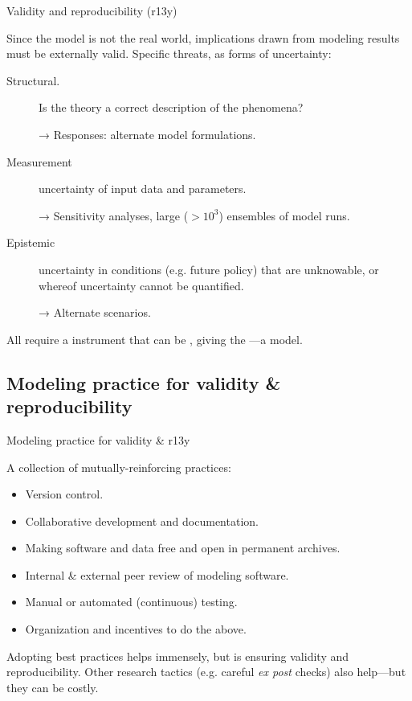 \documentclass[12pt,aspectratio=169]{beamer}
\begin{document}
\begin{frame}{Validity and reproducibility (r13y)}

  Since the model is not the real world, implications drawn from modeling results must be externally valid.
  Specific threats, as forms of uncertainty:

  \begin{description}
    \item [Structural.] Is the theory a correct description of the phenomena?

          → Responses: alternate model formulations.

    \item [Measurement] uncertainty of input data and parameters.

          → Sensitivity analyses, large ($>10^3$) ensembles of model runs.

    \item [Epistemic] uncertainty in conditions (e.g. future policy) that are unknowable, or whereof uncertainty cannot be quantified.

          → Alternate scenarios.
  \end{description}

  All require a  instrument that can be , giving the —a  model.
\end{frame}

\subsection{Modeling practice for validity \& reproducibility}
\begin{frame}{Modeling practice for validity \& r13y}

  A collection of mutually-reinforcing practices:
  \begin{itemize} \small
    \item Version control.
    \item Collaborative development and documentation.
    \item Making software and data free and open in permanent archives.
    \item Internal \& external peer review of modeling software.
    \item Manual or automated (continuous) testing.
    \item Organization and incentives to do the above.
  \end{itemize}

  \bigskip
  Adopting best practices helps immensely, but is  ensuring validity and reproducibility.
  Other research tactics (e.g. careful \emph{ex post} checks) also help—but they can be costly.

\end{frame}
\end{document}
